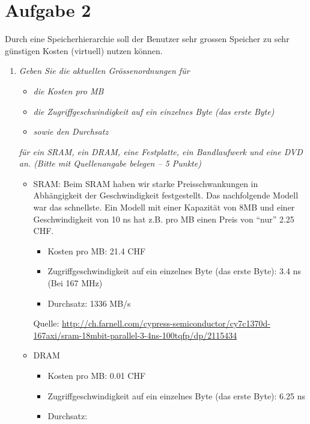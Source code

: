 \documentclass[10pt]{article}
\begin{document}
\section*{Aufgabe 2}
Durch eine Speicherhierarchie soll der Benutzer sehr grossen Speicher zu sehr günstigen Kosten (virtuell) nutzen können.
\begin{enumerate}[label=\alph*)]
	\item
		\textit{Geben Sie die aktuellen Grössenordnungen für}
			\begin{itemize}
				\item \textit{die Kosten pro MB}
				\item \textit{die Zugriffgeschwindigkeit auf ein einzelnes Byte (das erste Byte)}
				\item \textit{sowie den Durchsatz}
			\end{itemize}
		\textit{für ein SRAM, ein DRAM, eine Festplatte, ein Bandlaufwerk und eine DVD an. (Bitte mit Quellenangabe belegen – 5 Punkte)}
			
			\begin{itemize}
			
				\item SRAM: 
					Beim SRAM haben wir starke Preisschwankungen in Abhängigkeit der Geschwindigkeit festgestellt. Das nachfolgende Modell war das schnellste. Ein Modell mit einer Kapazität von 8MB und einer Geschwindigkeit von 10 ns hat z.B. pro MB einen Preis von "`nur"' 2.25 CHF.
					\begin{itemize}
						\item Kosten pro MB: 21.4 CHF
						\item Zugriffgeschwindigkeit auf ein einzelnes Byte (das erste Byte): 3.4 ns (Bei 167 MHz)
						\item Durchsatz: 1336 MB/s
					\end{itemize}
					Quelle: \url{http://ch.farnell.com/cypress-semiconductor/cy7c1370d-167axi/sram-18mbit-parallel-3-4ns-100tqfp/dp/2115434}

				\item DRAM
					\begin{itemize}
						\item Kosten pro MB: 0.01 CHF
						\item Zugriffgeschwindigkeit auf ein einzelnes Byte (das erste Byte): 6.25 ns
						\item Durchsatz:
					\end{itemize}
					

\end{itemize}
\end{enumerate}
\end{document}
